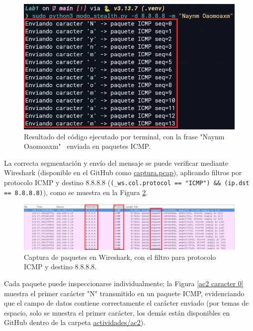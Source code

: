 \documentclass[letter,12pt]{article}
\begin{document}
\begin{figure}[H]
        \centering
        \includegraphics[width=15cm]{actividades/ac2/codigo_ejecutado.png}
        \caption{Resultado del código ejecutado por terminal, con la frase "Naynm Oaomoaxm" \ enviada en paquetes ICMP.}
        \label{ac2 codigo ejecutado}
\end{figure}

La correcta segmentación y envío del mensaje se puede verificar mediante Wireshark (disponible en el GitHub como \href{https://github.com/BrunoTrone1/cripto_lab1/blob/main/captura.pcap}{captura.pcap}), aplicando filtros por protocolo ICMP y destino 8.8.8.8 (\verb|(_ws.col.protocol == "ICMP") && (ip.dst == 8.8.8.8)|), como se muestra en la Figura \ref{ac2 captura wireshark}.

\begin{figure}[H]
        \centering
        \includegraphics[width=\linewidth]{actividades/ac2/captura_wireshark.png}
        \caption{Captura de paquetes en Wireshark, con el filtro para protocolo ICMP y destino 8.8.8.8.}
        \label{ac2 captura wireshark}
\end{figure}

Cada paquete puede inspeccionarse individualmente; la Figura \ref{ac2 caracter 0} muestra el primer carácter "N" transmitido en un paquete ICMP, evidenciando que el campo de datos contiene correctamente el carácter enviado (por temas de espacio, solo se muestra el primer carácter, los demás están disponibles en GitHub dentro de la carpeta \href{https://github.com/BrunoTrone1/cripto_lab1/tree/main/actividades/ac2}{actividades/ac2}).
\end{document}
